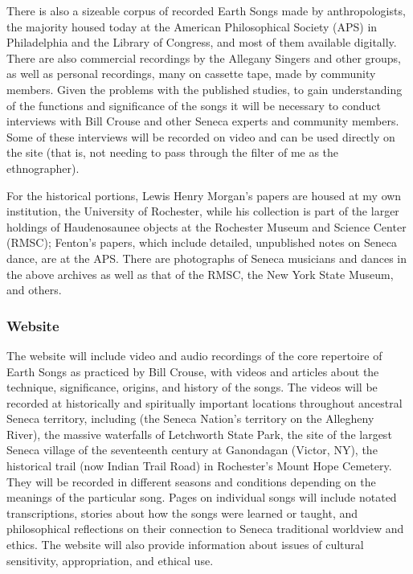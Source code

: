 \documentclass{neh}
\begin{document}
There is also a sizeable corpus of recorded Earth Songs made by
anthropologists, the majority housed today at the American Philosophical
Society (APS) in Philadelphia and the Library of Congress, and most of them
available digitally.
There are also commercial recordings by the Allegany Singers and other groups,
as well as personal recordings, many on cassette tape, made by community
members.
Given the problems with the published studies, to gain understanding of the
functions and significance of the songs it will be necessary to conduct
interviews with Bill Crouse and other Seneca experts and community members.
Some of these interviews will be recorded on video and can be used directly on
the site (that is, not needing to pass through the filter of me as the
ethnographer). 

For the historical portions, Lewis Henry Morgan's papers are housed at my own
institution, the University of Rochester, while his collection is part of the
larger holdings of Haudenosaunee objects at the Rochester Museum and Science
Center (RMSC); Fenton's papers, which include detailed, unpublished notes on
Seneca dance, are at the APS.
There are photographs of Seneca musicians and dances in the above archives as
well as that of the RMSC, the New York State Museum, and others.

\subsubsection{Website}

The website will include video and audio recordings of the core repertoire of
Earth Songs as practiced by Bill Crouse, with videos and articles about the
technique, significance, origins, and history of the songs.
The videos will be recorded at historically and spiritually important
locations throughout ancestral Seneca territory, including 
(the Seneca Nation's territory on the Allegheny River), the massive waterfalls
of Letchworth State Park, the site of the largest Seneca village of the
seventeenth century at Ganondagan (Victor, NY), the historical trail (now
Indian Trail Road) in Rochester's Mount Hope Cemetery.
They will be recorded in different seasons and conditions depending on the
meanings of the particular song.
Pages on individual songs will include notated transcriptions, stories about
how the songs were learned or taught, and philosophical reflections on their
connection to Seneca traditional worldview and ethics.
The website will also provide information about issues of cultural
sensitivity, appropriation, and ethical use.
\end{document}
